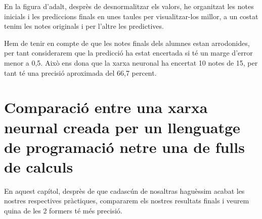 En la figura d'adalt, desprès de desnormalitzar els valors, he organitzat les notes inicials i les prediccions finals en unes taules per visualitzar-los millor, a un costat tenim les notes originals i per l'altre les predictives.

Hem de tenir en compte de que les notes finals dels alumnes estan arrodonides, per tant considerarem que la predicció ha estat encertada si té un marge d'error menor a 0,5. Això ens dona que la xarxa neuronal ha encertat 10 notes de 15, per tant té una precisió aproximada del 66,7 percent.

\section{Comparació entre una xarxa neurnal creada per un llenguatge de programació netre una de fulls de calculs}
En aquest capítol, desprès de que cadascún de nosaltras haguèssim acabat les nostres respectives pràctiques, compararem els nostres resultats finals i veurem quina de les 2 formers té més precisió.






















